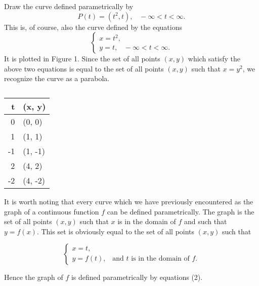 \begin{example} Draw the curve defined parametrically by
$$
P(t) = (t^2, t), \;\;\; -\infty < t < \infty.
$$
\noindent This is, of course, also the curve defined by the equations
$$
\left \{ \begin{array}{l}

x = t^2,\\
y = t, \;\;\; -\infty < t < \infty.
\end{array}
\right .
$$
\noindent It is plotted in Figure 1. Since the set of all points $(x, y)$ which satisfy the above two equations is equal to the set of all points $(x, y)$ such that $x = y^2$, we recognize the curve as a parabola.
\end{example}



\begin{table}
\centering
\begin{tabular}{r|l}
\hline
t    & (x, y) \\ \hline
0   & (0, 0) \\
1   & (1, 1) \\
-1  & (1, -1) \\
2   & (4, 2) \\
-2  & (4, -2) \\ \hline
\end{tabular}
\caption{}
\label{table 10.1}
\end{table}
\medskip

It is worth noting that every curve which we have previously encountered as the graph of a continuous function $f$ can be defined parametrically. The graph is the set of all points $(x, y)$ such that $x$ is in the domain of $f$ and such that $y = f(x)$. This set is obviously equal to the set of all points $(x, y)$ such that

 
\begin{equation}
\left \{ \begin{array}{l}
x = t,\\
y = f(t), \;\;\;\mbox{and $t$ is in the domain of $f$.}   
\end{array}
\right .
\label{eq10.1.2}
\end{equation}

\noindent Hence the graph of $f$ is defined parametrically by equations (2).

